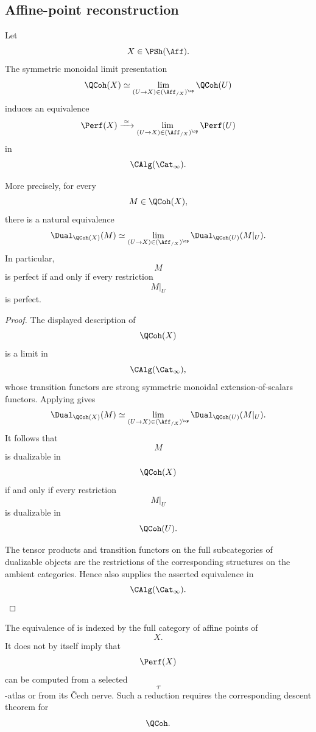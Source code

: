 \subsection{Affine-point reconstruction}

\begin{proposition}
\label{prop:perfect-limit-description}
Let
\[
    X\in\PSh(\Aff).
\]
The symmetric monoidal limit presentation
\[
    \QCoh(X)
    \simeq
    \lim_{
        (U\to X)\in(\Aff_{/X})^{\op}
    }
    \QCoh(U)
\]
induces an equivalence
\[
    \Perf(X)
    \xrightarrow{\;\simeq\;}
    \lim_{
        (U\to X)\in(\Aff_{/X})^{\op}
    }
    \Perf(U)
\]
in
\[
    \CAlg(\Cat_\infty).
\]

More precisely, for every
\[
    M\in\QCoh(X),
\]
there is a natural equivalence
\[
    \Dual_{\QCoh(X)}(M)
    \simeq
    \lim_{
        (U\to X)\in(\Aff_{/X})^{\op}
    }
    \Dual_{\QCoh(U)}(M|_U).
\]
In particular,
\[
    M
\]
is perfect if and only if every restriction
\[
    M|_U
\]
is perfect.
\end{proposition}

\begin{proof}
The displayed description of
\[
    \QCoh(X)
\]
is a limit in
\[
    \CAlg(\Cat_\infty),
\]
whose transition functors are strong symmetric monoidal
extension-of-scalars functors. Applying
gives
\[
    \Dual_{\QCoh(X)}(M)
    \simeq
    \lim_{
        (U\to X)\in(\Aff_{/X})^{\op}
    }
    \Dual_{\QCoh(U)}(M|_U).
\]
It follows that
\[
    M
\]
is dualizable in
\[
    \QCoh(X)
\]
if and only if every restriction
\[
    M|_U
\]
is dualizable in
\[
    \QCoh(U).
\]

The tensor products and transition functors on the full subcategories of
dualizable objects are the restrictions of the corresponding structures
on the ambient categories. Hence
also supplies the asserted equivalence in
\[
    \CAlg(\Cat_\infty).
\]
\end{proof}

\begin{remark}
\label{rem:perfect-affine-points-versus-descent}
The equivalence of
is indexed by the full category of affine points of
\[
    X.
\]
It does not by itself imply that
\[
    \Perf(X)
\]
can be computed from a selected
\[
    \tau
\]
-atlas or from its \v{C}ech nerve. Such a reduction requires the
corresponding descent theorem for
\[
    \QCoh.
\]
\end{remark}


